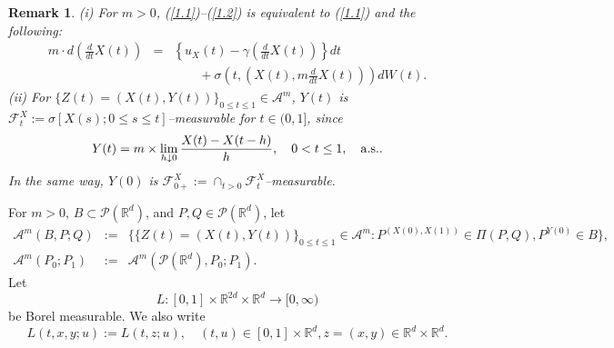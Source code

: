 \documentclass[12pt]{article}
\newtheorem{remark}{Remark}[section]
\begin{document}
\begin{remark}\label{rk1.1}
(i) For $m>0$, (\ref{1.1})--(\ref{1.2}) is equivalent to (\ref{1.1}) and the following:
\begin{eqnarray}\label{1.6}
m\cdot d\left(\frac{d}{dt}X(t)\right)&=&\left\{u_X(t)-\gamma \left(\frac{d}{dt}X(t)\right)\right\}dt\\
&&\qquad +\sigma\left(t,\left(X(t), m\frac{d}{dt}X(t)\right)\right)dW(t).\nonumber
\end{eqnarray}
(ii) For $\{Z(t)=(X(t),Y(t))\}_{0\le t\le 1}\in \mathcal{A}^m$,
$Y(t)$ is $\mathcal{F}^X_t:=\sigma [X(s);0\le s\le t ]$--measurable for $t\in (0,1]$, since
$$Y(t)=
m \times \lim_{h\downarrow 0}\frac{X(t)-X(t-h)}{h},\quad 0<t\le 1, \quad {\rm a.s..}
$$
In the same way, $Y(0)$ is $\mathcal{F}^X_{0+}:=\cap_{t>0}\mathcal{F}^X_t$--measurable.
\end{remark}



For $m>0$, $B\subset \mathcal{P}(\mathbb{R}^d)$, and $P,Q\in \mathcal{P}(\mathbb{R}^d)$, let
\begin{eqnarray*}
\mathcal{A}^m(B,P;Q)&:=&\{\{ Z(t)=(X(t),Y(t))\}_{0\le t\le 1}\in \mathcal{A}^m:
P^{(X(0), X(1))}\in \Pi(P,Q), P^{Y(0)}\in B\},\\
\mathcal{A}^m(P_0;P_1)&:=&\mathcal{A}^m(\mathcal{P}(\mathbb{R}^d),P_0;P_1).
\end{eqnarray*}
Let 
$$L:[0,1]\times \mathbb{R}^{2d} \times \mathbb{R}^d\longrightarrow [0,\infty )$$
be  Borel measurable.  
We also write
$$L(t,x,y;u):=L(t,z;u), \quad 
(t,u)\in [0,1]\times \mathbb{R}^d, z=(x,y)\in \mathbb{R}^d \times\mathbb{R}^d.$$
\end{document}
